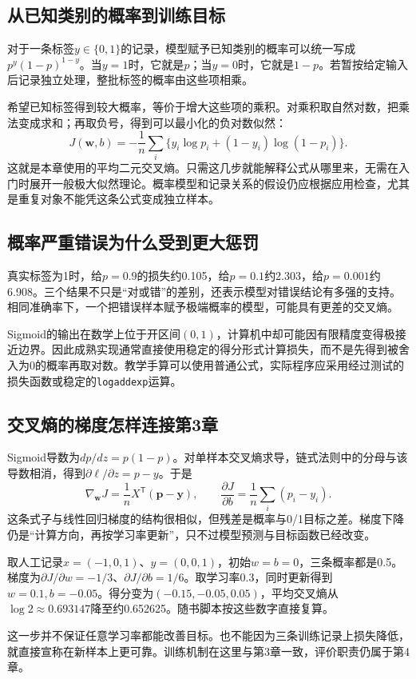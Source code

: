 \subsection{从已知类别的概率到训练目标}
对于一条标签$y\in\{0,1\}$的记录，模型赋予已知类别的概率可以统一写成$p^y(1-p)^{1-y}$。当$y=1$时，它就是$p$；当$y=0$时，它就是$1-p$。若暂按给定输入后记录独立处理，整批标签的概率由这些项相乘。

希望已知标签得到较大概率，等价于增大这些项的乘积。对乘积取自然对数，把乘法变成求和；再取负号，得到可以最小化的负对数似然：
\[
J(\mathbf w,b)=-\frac1n\sum_i\{y_i\log p_i+(1-y_i)\log(1-p_i)\}.
\]
这就是本章使用的平均二元交叉熵。只需这几步就能解释公式从哪里来，无需在入门时展开一般极大似然理论。概率模型和记录关系的假设仍应根据应用检查，尤其是重复对象不能凭这条公式变成独立样本。

\subsection{概率严重错误为什么受到更大惩罚}
真实标签为1时，给$p=0.9$的损失约0.105，给$p=0.1$约2.303，给$p=0.001$约6.908。三个结果不只是“对或错”的差别，还表示模型对错误结论有多强的支持。相同准确率下，一个把错误样本赋予极端概率的模型，可能具有更差的交叉熵。

Sigmoid的输出在数学上位于开区间$(0,1)$，计算机中却可能因有限精度变得极接近边界。因此成熟实现通常直接使用稳定的得分形式计算损失，而不是先得到被舍入为0的概率再取对数。教学手算可以使用普通公式，实际程序应采用经过测试的损失函数或稳定的\texttt{logaddexp}运算。

\subsection{交叉熵的梯度怎样连接第3章}
Sigmoid导数为$dp/dz=p(1-p)$。对单样本交叉熵求导，链式法则中的分母与该导数相消，得到$\partial\ell/\partial z=p-y$。于是
\[
\nabla_{\mathbf w}J=\frac1nX^{\mathsf T}(\mathbf p-\mathbf y),\qquad
\frac{\partial J}{\partial b}=\frac1n\sum_i(p_i-y_i).
\]
这条式子与线性回归梯度的结构很相似，但残差是概率与0/1目标之差。梯度下降仍是“计算方向，再按学习率更新”，只不过模型预测与目标函数已经改变。

取人工记录$x=(-1,0,1)$、$y=(0,0,1)$，初始$w=b=0$，三条概率都是0.5。梯度为$\partial J/\partial w=-1/3$、$\partial J/\partial b=1/6$。取学习率0.3，同时更新得到$w=0.1,b=-0.05$。得分变为$(-0.15,-0.05,0.05)$，平均交叉熵从$\log2\approx0.693147$降至约0.652625。随书脚本按这些数字直接复算。

这一步并不保证任意学习率都能改善目标。也不能因为三条训练记录上损失降低，就直接宣称在新样本上更可靠。训练机制在这里与第3章一致，评价职责仍属于第4章。

